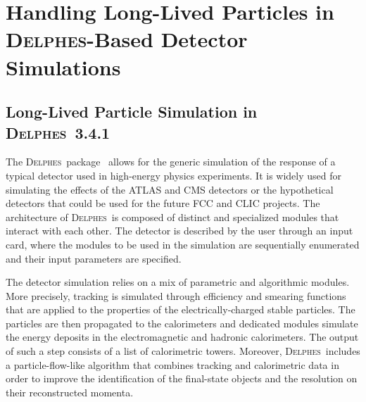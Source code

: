 
\newcommand{\MG}{\textsc{MadGraph}~5\_aMC@NLO}
\newcommand{\PY}{\textsc{Pythia}~8}
\newcommand{\MA}{\textsc{MadAnalysis}~5}
\newcommand{\MW}{\textsc{MadWidth}}
\newcommand{\MAnorm}{{MadAnalysis}~5}
\newcommand{\FJ}{\textsc{FastJet}}
\newcommand{\DEL}{\textsc{Delphes}}
\newcommand{\ROOT}{\textsc{Root}}




\section{Handling Long-Lived Particles in \DEL-Based Detector Simulations}
\label{sec:ch5-recastingDelphes}

\subsection{Long-Lived Particle Simulation in \DEL~3.4.1}

The \DEL\ package~\cite{deFavereau:2013fsa} allows for the generic simulation of
the response of a typical detector used in high-energy physics experiments. It
is widely used for simulating the effects of the ATLAS and CMS detectors or the
hypothetical detectors that could be used for the future FCC and CLIC projects.
The architecture of \DEL\ is composed of distinct
and specialized modules that interact with each other. The detector is described
by the user through an input card, where the modules to be used in the
simulation are sequentially enumerated and their input parameters are specified.

The detector simulation relies on a mix of parametric and algorithmic
modules. More precisely, tracking is simulated through efficiency and smearing
functions that are applied to the properties of the electrically-charged stable
particles. The particles are then propagated to the calorimeters and dedicated
modules simulate the energy deposits in the electromagnetic and hadronic
calorimeters. The output of such a step consists of a list of calorimetric towers.
Moreover, \DEL\ includes a particle-flow-like
algorithm that combines tracking and calorimetric data in order to
improve the identification of the final-state objects and the resolution on
their reconstructed momenta.

